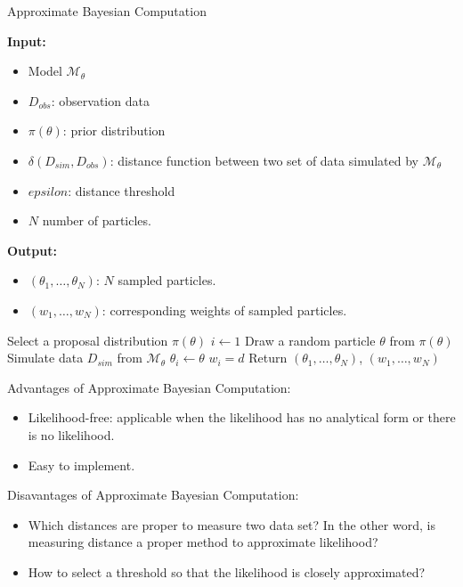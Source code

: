 \begin{algorithm}[H]
      \caption{Approximate Bayesian Computation}
      \label{alg:abc-reject}
      \footnotesize{
            \hspace*{\algorithmicindent} \textbf{Input:}
            \begin{itemize}
                  \item Model $\mathcal{M}_\theta$
                  \item $D_{obs}$: observation data
                  \item $\pi(\theta)$: prior distribution
                  \item $\delta(D_{sim}, D_{obs})$: distance function between two set of data simulated by $\mathcal{M}_\theta$
                  \item $epsilon$: distance threshold
                  \item $N$ number of particles.
            \end{itemize}
            \hspace*{\algorithmicindent} \textbf{Output:}
            \begin{itemize}
                  \item $(\theta_1,\ldots,\theta_N)$: $N$ sampled particles.
                  \item $(w_1,\ldots,w_N)$: corresponding weights of sampled particles.
            \end{itemize}
      }
      \begin{algorithmic}[1]
            \State Select a proposal distribution $\pi(\theta)$
            \State $i \leftarrow 1$
            \State Draw a random particle $\theta$ from $\pi(\theta)$
            \State Simulate data $D_{sim}$ from $\mathcal{M}_\theta$
            \State $\theta_i \leftarrow \theta$
            \State $w_i = d$
            \EndIf
            \EndWhile
            \State Return $(\theta_1,\ldots,\theta_N)$, $(w_1,\ldots,w_N)$
            \EndProcedure
      \end{algorithmic}
\end{algorithm}
Advantages of Approximate Bayesian Computation:
\begin{itemize}
      \item Likelihood-free: applicable when the likelihood has no analytical form or there is no likelihood.
      \item Easy to implement.
\end{itemize}
Disavantages of Approximate Bayesian Computation:
\begin{itemize}
      \item Which distances are proper to measure two data set? In the other word, is measuring
            distance a proper method to approximate likelihood?
      \item How to select a threshold so that the likelihood is closely approximated?
\end{itemize}

